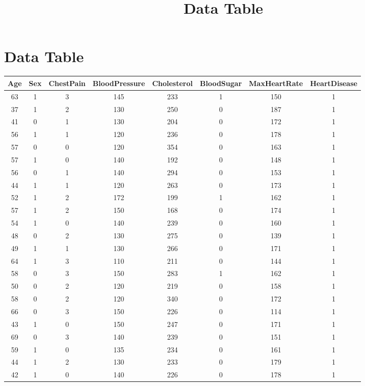 \documentclass{article}
\begin{document}
\title{Data Table}
\maketitle
\section*{Data Table}
\begin{longtable}{|c|c|c|c|c|c|c|c|}
\hline
Age & Sex & ChestPain & BloodPressure & Cholesterol & BloodSugar & MaxHeartRate & HeartDisease \\ \hline
63 & 1 & 3 & 145 & 233 & 1 & 150 & 1 \\ \hline
37 & 1 & 2 & 130 & 250 & 0 & 187 & 1 \\ \hline
41 & 0 & 1 & 130 & 204 & 0 & 172 & 1 \\ \hline
56 & 1 & 1 & 120 & 236 & 0 & 178 & 1 \\ \hline
57 & 0 & 0 & 120 & 354 & 0 & 163 & 1 \\ \hline
57 & 1 & 0 & 140 & 192 & 0 & 148 & 1 \\ \hline
56 & 0 & 1 & 140 & 294 & 0 & 153 & 1 \\ \hline
44 & 1 & 1 & 120 & 263 & 0 & 173 & 1 \\ \hline
52 & 1 & 2 & 172 & 199 & 1 & 162 & 1 \\ \hline
57 & 1 & 2 & 150 & 168 & 0 & 174 & 1 \\ \hline
54 & 1 & 0 & 140 & 239 & 0 & 160 & 1 \\ \hline
48 & 0 & 2 & 130 & 275 & 0 & 139 & 1 \\ \hline
49 & 1 & 1 & 130 & 266 & 0 & 171 & 1 \\ \hline
64 & 1 & 3 & 110 & 211 & 0 & 144 & 1 \\ \hline
58 & 0 & 3 & 150 & 283 & 1 & 162 & 1 \\ \hline
50 & 0 & 2 & 120 & 219 & 0 & 158 & 1 \\ \hline
58 & 0 & 2 & 120 & 340 & 0 & 172 & 1 \\ \hline
66 & 0 & 3 & 150 & 226 & 0 & 114 & 1 \\ \hline
43 & 1 & 0 & 150 & 247 & 0 & 171 & 1 \\ \hline
69 & 0 & 3 & 140 & 239 & 0 & 151 & 1 \\ \hline
59 & 1 & 0 & 135 & 234 & 0 & 161 & 1 \\ \hline
44 & 1 & 2 & 130 & 233 & 0 & 179 & 1 \\ \hline
42 & 1 & 0 & 140 & 226 & 0 & 178 & 1 \\ \hline

\end{longtable}
\end{document}
